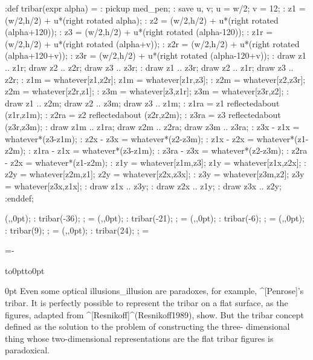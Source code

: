  \MT:def tribar(expr alpha) =
 \MT: pickup med_pen;
 \MT: save u, v; u = w/2; v = 12;
 \MT: z1 = (w/2,h/2) + u*(right rotated alpha);
 \MT: z2 = (w/2,h/2) + u*(right rotated (alpha+120));
 \MT: z3 = (w/2,h/2) + u*(right rotated (alpha-120));
 \MT: z1r = (w/2,h/2) + u*(right rotated (alpha+v));
 \MT: z2r = (w/2,h/2) + u*(right rotated (alpha+120+v));
 \MT: z3r = (w/2,h/2) + u*(right rotated (alpha-120+v));
 \MT: draw z1 .. z1r; draw z2 .. z2r; draw z3 .. z3r;
 \MT: draw z1 .. z3r; draw z2 .. z1r; draw z3 .. z2r;
 \MT: z1m = whatever[z1,z2r]; z1m = whatever[z1r,z3];
 \MT: z2m = whatever[z2,z3r]; z2m = whatever[z2r,z1];
 \MT: z3m = whatever[z3,z1r]; z3m = whatever[z3r,z2];
 \MT: draw z1 .. z2m; draw z2 .. z3m; draw z3 .. z1m;
 \MT: z1ra = z1 reflectedabout (z1r,z1m);
 \MT: z2ra = z2 reflectedabout (z2r,z2m);
 \MT: z3ra = z3 reflectedabout (z3r,z3m);
 \MT: draw z1m .. z1ra; draw z2m .. z2ra; draw z3m .. z3ra;
 \MT: z3x - z1x = whatever*(z3-z1m);
 \MT: z2x - z3x = whatever*(z2-z3m);
 \MT: z1x - z2x = whatever*(z1-z2m);
 \MT: z1ra - z1x = whatever*(z3-z1m);
 \MT: z3ra - z3x = whatever*(z2-z3m);
 \MT: z2ra - z2x = whatever*(z1-z2m);
 \MT: z1y = whatever[z1m,z3]; z1y = whatever[z1x,z2x];
 \MT: z2y = whatever[z2m,z1]; z2y = whatever[z2x,z3x];
 \MT: z3y = whatever[z3m,z2]; z3y = whatever[z3x,z1x];
 \MT: draw z1x .. z3y;
 \MT: draw z2x .. z1y;
 \MT: draw z3x .. z2y;
 \MT:enddef;

 \newdimen\tribar \tribar=75pt

 \MTbeginchar(\the\tribar,\the\tribar,0pt);
 \MT: tribar(-36);
 \MTendchar; =\box\MTbox
 \MTbeginchar(\the\tribar,\the\tribar,0pt);
 \MT: tribar(-21);
 \MTendchar; =\box\MTbox
 \MTbeginchar(\the\tribar,\the\tribar,0pt);
 \MT: tribar(-6);
 \MTendchar; =\box\MTbox
 \MTbeginchar(\the\tribar,\the\tribar,0pt);
 \MT: tribar(9);
 \MTendchar; =\box\MTbox
 \MTbeginchar(\the\tribar,\the\tribar,0pt);
 \MT: tribar(24);
 \MTendchar; =\box\MTbox

 =\hsize \advance{}-\tribar

\nointerlineskip
  \hbox to0pt{\kern{}\vbox to0pt{\kern12pt
  \kern-10pt\kern-9pt\kern-9pt\kern-12pt\vss}\hss}%
\nointerlineskip

\strut{} 0pt 
Even some optical illusions_{illusion} are paradoxes, for example,
^[Penrose]'s tribar. It is perfectly possible to represent the tribar on
a flat surface, as the figures, adapted from
^[Resnikoff]^(Resnikoff1989), show. But the tribar concept defined as
the solution to the problem of constructing the three-\allowhyphens
dimensional thing whose two-\allowhyphens dimensional representations
are the flat tribar figures is paradoxical.

